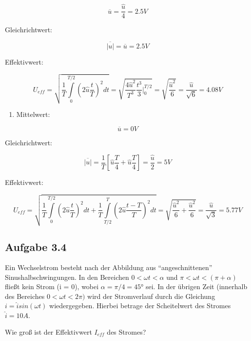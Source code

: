 \documentclass[
  ngerman,
  letterpaper,
]{scrbook}
\providecommand{\tightlist}{%
  \setlength{\itemsep}{0pt}\setlength{\parskip}{0pt}}
\begin{document}
\begin{tcolorbox}
\[
\overline{u} = \frac{\hat{u}}{4} = 2.5 V
\]

Gleichrichtwert:

\[
\overline{|u|} = \overline{u} = 2.5 V
\]

Effektivwert:

\[
U_{eff} = \sqrt{\frac{1}{T} \int\limits_{0}^{T/2} \left(2\hat{u} \frac{t}{T} \right)^2 dt} 
= \sqrt{\frac{4\hat{u}^2}{T^3} \frac{t^3}{3} \Big\vert_0^{T/2}} 
= \sqrt{\frac{\hat{u}^2}{6}} 
= \frac{\hat{u}}{\sqrt{6}} = 4.08 V
\]

\begin{enumerate}
\def\labelenumi{\alph{enumi})}
\setcounter{enumi}{3}
\tightlist
\item
  Mittelwert:
\end{enumerate}

\[
\overline{u} = 0 V
\]

Gleichrichtwert:

\[
\overline{|u|} = \frac{1}{T} \left[ \hat{u} \frac{T}{4} + \hat{u} \frac{T}{4} \right] = \frac{\hat{u}}{2} = 5 V
\]

Effektivwert:

\[
U_{eff} = \sqrt{\frac{1}{T} \int\limits_{0}^{T/2} \left( 2\hat{u} \frac{t}{T} \right)^2 dt 
+ \frac{1}{T} \int\limits_{T/2}^{T} \left( 2\hat{u} \frac{t - T}{T} \right)^2 dt} 
= \sqrt{\frac{\hat{u}^2}{6} + \frac{\hat{u}^2}{6}} = \frac{\hat{u}}{\sqrt{3}} = 5.77 V
\]

\end{tcolorbox}

\subsection{Aufgabe 3.4}\label{aufgabe-3.4}

Ein Wechselstrom besteht nach der Abbildung aus ``angeschnittenen''
Sinushalbschwingungen. In den Bereichen \(0 < \omega t < \alpha\) und
\(\pi < \omega t < (\pi + \alpha)\) fließt kein Strom (i = 0), wobei
\(\alpha = \pi/4 = 45°\) sei. In der übrigen Zeit (innerhalb des
Bereiches \(0 < \omega t < 2\pi)\) wird der Stromverlauf durch die
Gleichung \(i =
\hat{i} sin(\omega t)\) wiedergegeben. Hierbei betrage der Scheitelwert
des Stromes \(\hat{i} = 10 A\).

Wie groß ist der Effektivwert \(I_{eff}\) des Stromes?
\end{document}

